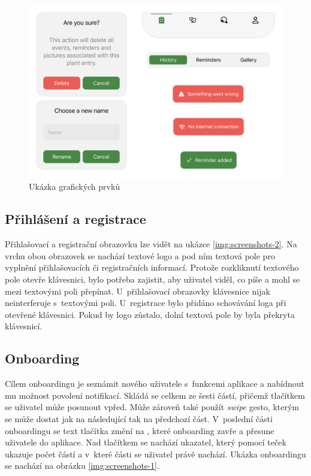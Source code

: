 \documentclass[thesis=M,czech]{FITthesis}[2019/12/23]
\begin{document}
\begin{figure}[H]
	\centering
	\includegraphics[width=1\linewidth]{images/gui-elements.png}
  	\caption{Ukázka grafických prvků}
  	\label{img:gui-elements}
\end{figure}

\subsection{Přihlášení a registrace}
Přihlašovací a registrační obrazovku lze vidět na ukázce \ref{img:screenshots-2}. Na vrchu obou obrazovek se nachází textové logo a pod ním textová pole pro vyplnění přihlašovacích či registračních informací. Protože rozkliknutí textového pole otevře klávesnici, bylo potřeba zajistit, aby uživatel viděl, co píše a mohl se mezi textovými poli přepínat. U~přihlašovací obrazovky klávesnice nijak neinterferuje s~textovými poli. U~registrace bylo přidáno schovávání loga při otevřené klávesnici. Pokud by logo zůstalo, dolní textová pole by byla překryta klávesnicí.

\subsection{Onboarding}
Cílem onboardingu je seznámit nového uživatele s~funkcemi aplikace a nabídnout mu možnost povolení notifikací. Skládá se celkem ze šesti částí, přičemž tlačítkem  se uživatel může posunout vpřed. Může zároveň také použít \textit{swipe} gesto, kterým se může dostat jak na následující tak na předchozí část. V~poslední části onboardingu se text tlačítka změní na , které onboarding zavře a přesune uživatele do aplikace. Nad tlačítkem se nachází ukazatel, který pomocí teček ukazuje počet částí a v~které části se uživatel právě nachází. Ukázka onboardingu se nachází na obrázku \ref{img:screenshots-1}.
\end{document}
